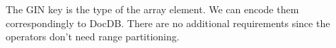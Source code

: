 The GIN key is the type of the array element.  We can encode them
correspondingly to DocDB.  There are no additional requirements since the
operators don't need range partitioning.
